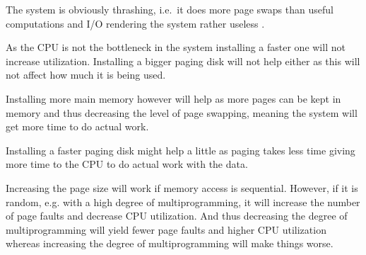 \documentclass[a4paper]{miunasgn}
\begin{document}
\begin{questions}
	\begin{solution}
		The system is obviously thrashing, i.e.\ it does more page swaps than useful 
		computations and I/O rendering the system rather useless \citep[p.  
		386]{Silberschatz2009osc}.

		As the CPU is not the bottleneck in the system installing a faster one will 
		not increase utilization.
		Installing a bigger paging disk will not help either as this will not 
		affect how much it is being used.
		
		Installing more main memory however will help as more pages can be kept in 
		memory and thus decreasing the level of page swapping, meaning the system 
		will get more time to do actual work.

		Installing a faster paging disk might help a little as paging takes less 
		time giving more time to the CPU to do actual work with the data.

		Increasing the page size will work if memory access is sequential.
		However, if it is random, e.g. with a high degree of multiprogramming, it 
		will increase the number of page faults and decrease CPU utilization.
		And thus decreasing the degree of multiprogramming will yield fewer page 
		faults and higher CPU utilization whereas increasing the degree of 
		multiprogramming will make things worse.


\end{solution}
\end{questions}
\end{document}
